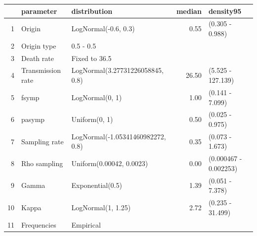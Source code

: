 \begin{table}[ht]
\centering
\begin{tabular}{rllrl}
  \hline
 & parameter & distribution & median & density95 \\ 
  \hline
1 & Origin & LogNormal(-0.6, 0.3) & 0.55 & (0.305 - 0.988) \\ 
  2 & Origin type & 0.5 - 0.5 &  &  \\ 
  3 & Death rate & Fixed to 36.5 &  &  \\ 
  4 & Transmission rate & LogNormal(3.27731226058845, 0.8) & 26.50 & (5.525 - 127.139) \\ 
  5 & fsymp & LogNormal(0, 1) & 1.00 & (0.141 - 7.099) \\ 
  6 & pasymp & Uniform(0, 1) & 0.50 & (0.025 - 0.975) \\ 
  7 & Sampling rate & LogNormal(-1.05341460982272, 0.8) & 0.35 & (0.073 - 1.673) \\ 
  8 & Rho sampling & Uniform(0.00042, 0.0023) & 0.00 & (0.000467 - 0.002253) \\ 
  9 & Gamma & Exponential(0.5) & 1.39 & (0.051 - 7.378) \\ 
  10 & Kappa & LogNormal(1, 1.25) & 2.72 & (0.235 - 31.499) \\ 
  11 & Frequencies & Empirical &  &  \\ 
   \hline
\end{tabular}
\end{table}

